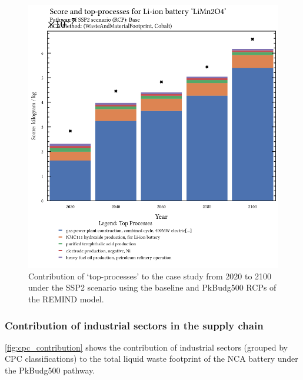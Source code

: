 \begin{figure}[ht!]
    \centering
    \includegraphics[width=0.8\linewidth]{figures/top-processes.png}
    \caption{Contribution of `top-processes' to the case study from 2020 to 2100 under the SSP2 scenario using the baseline and PkBudg500 RCPs of the REMIND model.}\label{fig:top_contribution}
\end{figure}

\subsubsection{Contribution of industrial sectors in the supply chain}\label{sec:results-case_study-topsectors}

\autoref{fig:cpc_contribution} shows the contribution of industrial sectors (grouped by CPC classifications) to the total liquid waste footprint of the NCA battery under the PkBudg500 pathway.

